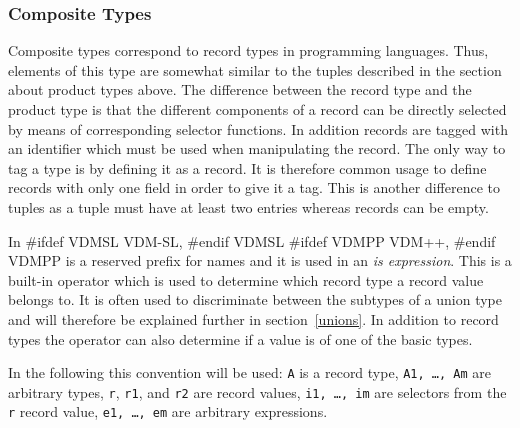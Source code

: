 \documentclass[\pformat,12pt]{article}
\newcommand{\vdmslpp}[2]{%
#ifdef VDMSL
#1
#endif VDMSL
#ifdef VDMPP
#2
#endif VDMPP
}
\newcommand{\vdmsl}{VDM-SL}
\newcommand{\vdmpp}{VDM++}
\begin{document}
\subsubsection{Composite Types}\label{records}

Composite types correspond to record types in programming languages.
Thus, elements of this type are somewhat similar to the tuples
described in the section about product types above. The difference
between the record type and the product type is that the different
components of a record can be directly selected by means of
corresponding selector functions. In addition records are tagged with
an identifier which must be used when manipulating the record. The
only way to tag a type is by defining it as a record. It is therefore
common usage to define records with only one field in order to give it
a tag. This is another difference to tuples as a tuple must have at
least two entries whereas records can be empty.

In \vdmslpp{\vdmsl,}{\vdmpp,}  is a reserved prefix for names
and it is used in an {\it is expression}. This is a built-in operator
which is used to determine which record type a record value belongs to.
It is often used to discriminate between the subtypes of a union type
and will therefore be explained further in section~\ref{unions}. In
addition to record types the  operator can also determine if
a value is of one of the basic types.
 
In the following this convention will be used: {\tt A} is a record
type, {\tt A1, \ldots, Am} are arbitrary types, {\tt r}, {\tt r1}, and
{\tt r2} are record values, {\tt i1, \ldots, im} are selectors from
the {\tt r} record value, {\tt e1, \ldots, em} are arbitrary
expressions.
\end{document}
